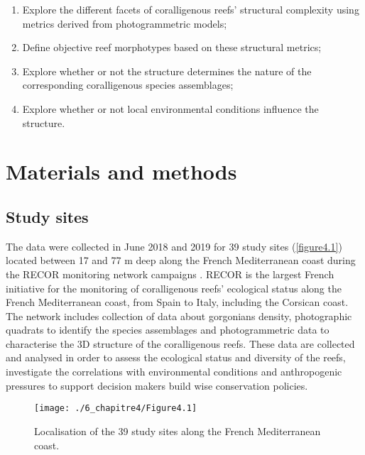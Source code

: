 \begin{enumerate}
    \item Explore the different facets of coralligenous reefs’ structural complexity using metrics derived from photogrammetric models;
    
    \item Define objective reef morphotypes based on these structural metrics;
    
    \item Explore whether or not the structure determines the nature of the corresponding coralligenous species assemblages;
    
    \item Explore whether or not local environmental conditions influence the structure.
\end{enumerate}

\section{Materials and methods}\label{chapitre4_2}

\subsection{Study sites}\label{chapitre4_2.1}
The data were collected in June 2018 and 2019 for 39 study sites (\autoref{figure4.1}) located between 17 and 77 m deep along the French Mediterranean coast during the RECOR monitoring network campaigns \citep{andromede-oceanologie_recor_2020}. RECOR is the largest French initiative for the monitoring of coralligenous reefs’ ecological status along the French Mediterranean coast, from Spain to Italy, including the Corsican coast. The network includes collection of data about gorgonians density, photographic quadrats to identify the species assemblages and photogrammetric data to characterise the 3D structure of the coralligenous reefs. These data are collected and analysed in order to assess the ecological status and diversity of the reefs, investigate the correlations with environmental conditions and anthropogenic pressures to support decision makers build wise conservation policies.

\begin{figure}[H]
	\begin{center}
	\texttt{[image: ./6\_chapitre4/Figure4.1]}
		\caption[Localisation of the 39 study sites along the French Mediterranean coast]{Localisation of the 39 study sites along the French Mediterranean coast.}
	\label{figure4.1}
\end{center}
\end{figure}

